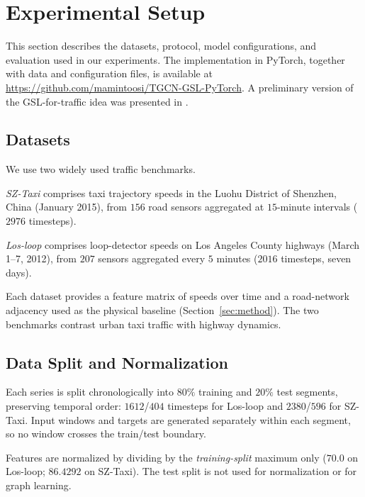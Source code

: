 \section{Experimental Setup}\label{sec:setup}

This section describes the datasets, protocol, model configurations, and
evaluation used in our experiments. The implementation in PyTorch, together
with data and configuration files, is available at
\url{https://github.com/mamintoosi/TGCN-GSL-PyTorch}. A preliminary version
of the GSL-for-traffic idea was presented in
\cite{Amintoosi1403aimc55-GSL}.

\subsection{Datasets}\label{sec:datasets}

We use two widely used traffic benchmarks.

\emph{SZ-Taxi} comprises taxi trajectory speeds in the Luohu District of
Shenzhen, China (January 2015), from $156$ road sensors aggregated at
$15$-minute intervals ($2976$ timesteps).

\emph{Los-loop} comprises loop-detector speeds on Los Angeles County
highways (March 1--7, 2012), from $207$ sensors aggregated every $5$
minutes ($2016$ timesteps, seven days).

Each dataset provides a feature matrix of speeds over time and a
road-network adjacency used as the physical baseline
(Section~\ref{sec:method}). The two benchmarks contrast urban taxi traffic
with highway dynamics.

\subsection{Data Split and Normalization}\label{sec:split}

Each series is split chronologically into $80\%$ training and $20\%$ test
segments, preserving temporal order: $1612$/$404$ timesteps for Los-loop
and $2380$/$596$ for SZ-Taxi. Input windows and targets are generated
separately within each segment, so no window crosses the train/test
boundary.

Features are normalized by dividing by the \emph{training-split} maximum
only ($70.0$ on Los-loop; $86.4292$ on SZ-Taxi). The test split is not used
for normalization or for graph learning.

